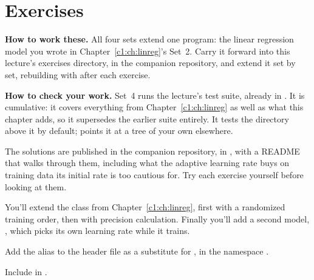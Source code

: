 
\section{Exercises}
\label{c2:sec:exercises}\label{c2:app:b}

\begin{aside}
\textbf{How to work these.} All four sets extend one program: the linear regression model you
wrote in Chapter~\ref{c1:ch:linreg}'s Set~2. Carry it forward into this lecture's exercises
directory,  in the companion repository, and extend it set by set,
rebuilding with  after each exercise.

\textbf{How to check your work.} Set~4 runs the lecture's test suite, already in
. It is cumulative: it covers everything from
Chapter~\ref{c1:ch:linreg} as well as what this chapter adds, so it supersedes the earlier suite
entirely. It tests the directory above it by default;  points it at a tree
of your own elsewhere.

The solutions are published in the companion repository, in , with a
README that walks through them, including what the adaptive learning rate buys on training data its
initial rate is too cautious for. Try each exercise yourself before looking at them.
\end{aside}

You'll extend the  class from Chapter~\ref{c1:ch:linreg}, first with a
randomized training order, then with precision calculation. Finally you'll add a second model,
, which picks its own learning rate while it trains.

\label{c2:set:1}

\label{c2:ex:1}
Add the alias  to the header file  as a substitute for
, in the namespace .

Include  in .

